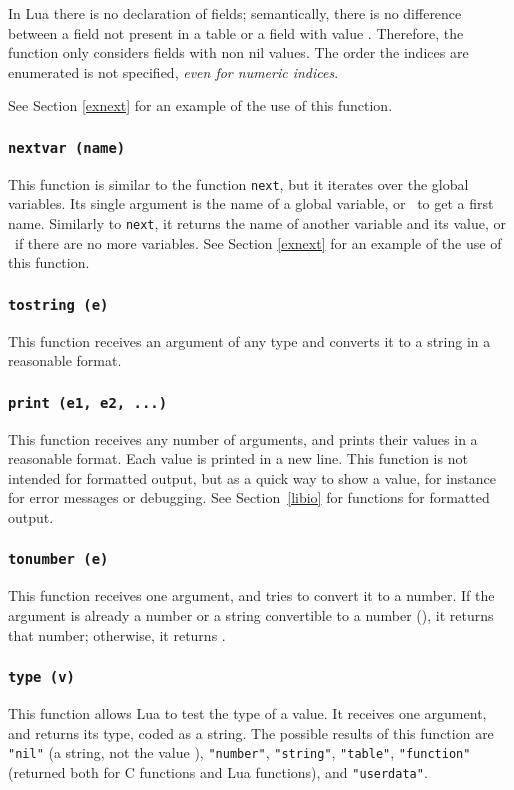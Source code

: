 In Lua there is no declaration of fields;
semantically, there is no difference between a
field not present in a table or a field with value \nil.
Therefore, the function only considers fields with non nil values.
The order the indices are enumerated is not specified,
{\em even for numeric indices}.

See Section \ref{exnext} for an example of the use of this function.

\subsubsection*{{\tt nextvar (name)}}
This function is similar to the function \verb'next',
but it iterates over the global variables.
Its single argument is the name of a global variable,
or \nil\ to get a first name.
Similarly to \verb'next', it returns the name of another variable
and its value,
or \nil\ if there are no more variables.
See Section \ref{exnext} for an example of the use of this function.

\subsubsection*{{\tt tostring (e)}}
This function receives an argument of any type and
converts it to a string in a reasonable format.

\subsubsection*{{\tt print (e1, e2, ...)}}
This function receives any number of arguments,
and prints their values in a reasonable format.
Each value is printed in a new line.
This function is not intended for formatted output,
but as a quick way to show a value,
for instance for error messages or debugging.
See Section~\ref{libio} for functions for formatted output.

\subsubsection*{{\tt tonumber (e)}}
This function receives one argument,
and tries to convert it to a number.
If the argument is already a number or a string convertible
to a number (), it returns that number;
otherwise, it returns \nil.

\subsubsection*{{\tt type (v)}}
This function allows Lua to test the type of a value.
It receives one argument, and returns its type, coded as a string.
The possible results of this function are
\verb'"nil"' (a string, not the value \nil),
\verb'"number"',
\verb'"string"',
\verb'"table"',
\verb'"function"' (returned both for C functions and Lua functions),
and \verb'"userdata"'.

